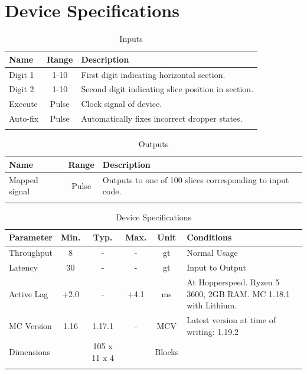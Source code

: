 \documentclass[10pt]{datasheet}
\begin{document}
\onecolumn

\section{Device Specifications}

\begin{table}[h]
    \caption{Inputs}
    \begin{tabularx}{\textwidth}{l | c | X}
        \thickhline
        \textbf{Name} & \textbf{Range} & \textbf{Description} \\
        \hline
        Digit 1 & 1-10 & First digit indicating horizontal section. \\
        Digit 2 & 1-10 & Second digit indicating slice position in section. \\
        \hline
        Execute & Pulse & Clock signal of device. \\
        Auto-fix & Pulse & Automatically fixes incorrect dropper states. \\
        \thickhline
\end{tabularx}
\end{table}

\begin{table}[h]
    \caption{Outputs}
    \begin{tabularx}{\textwidth}{l | c | X}
        \thickhline
        \textbf{Name} & \textbf{Range} & \textbf{Description} \\
        \hline
        Mapped signal & Pulse & Outputs to one of 100 slices corresponding to input code. \\
        \thickhline
\end{tabularx}
\end{table}

\begin{table}[h]
    \caption{Device Specifications}
    \begin{tabularx}{\textwidth}{l | c c c | c | X}
        \thickhline
        \textbf{Parameter} & \textbf{Min.} & \textbf{Typ.} & \textbf{Max.} &
        \textbf{Unit} & \textbf{Conditions} \\
        \hline
        Throughput  & 8 & - & - & gt & Normal Usage \\
        \hline
        Latency  & 30 & - & - & gt & Input to Output \\
        \hline
        Active Lag & +2.0 & - & +4.1 & ms & At Hopperspeed. Ryzen 5 3600, 2GB RAM. MC 1.18.1 with Lithium. \\
        \hline
        MC Version & 1.16 & 1.17.1 & - & MCV & Latest version at time of writing: 1.19.2\\
        \hline
        Dimensions & & 105 x 11 x 4 & & Blocks & \\
        \thickhline
\end{tabularx}
\end{table}
\newpage
\end{document}
